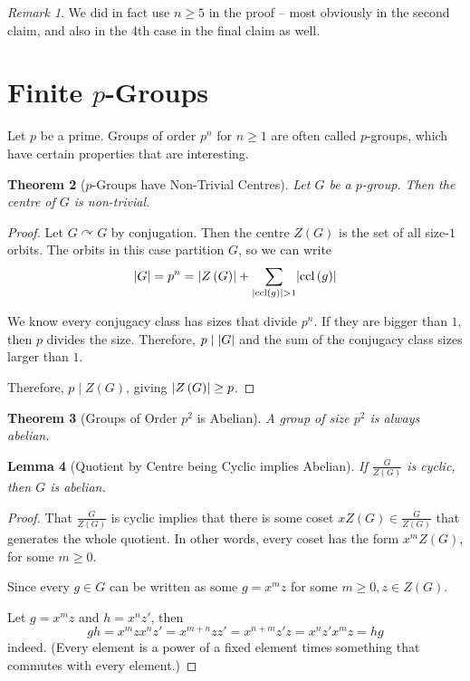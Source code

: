 \documentclass{article}
\newtheorem{theorem}{Theorem}[section]
\newtheorem{lemma}[theorem]{Lemma}
\theoremstyle{definition}
\theoremstyle{remark}
\newtheorem{remark}[theorem]{Remark}
\DeclarePairedDelimiter{\abs}{\lvert}{\rvert}
\newcommand{\pqty}[1]{\left(#1\right)}
\newcommand{\flatfrac}[2]{\frac{#1}{#2}}
\newcommand{\actson}{\curvearrowright}
\newcommand{\divides}{\mid}
\newcommand{\ccl}{\operatorname{ccl}}
\begin{document}
\begin{remark}
    We did in fact use \(n \geq 5\) in the proof -- most obviously in the second claim, and also in the 4th case in the final claim as well.
\end{remark}

\section{Finite \(p\)-Groups}

Let \(p\) be a prime. Groups of order \(p^n\) for \(n \geq 1\) are often called \(p\)-groups, which have certain properties that are interesting.

\begin{theorem}[\(p\)-Groups have Non-Trivial Centres]
    \label{thm:p-groups-non-trivial-centre}%
    Let \(G\) be a \(p\)-group. Then the centre of \(G\) is non-trivial.
\end{theorem}

\begin{proof}
    Let \(G \actson G\) by conjugation. Then the centre \(Z\pqty{G}\) is the set of all size-\(1\) orbits. The orbits in this case partition \(G\), so we can write
    \[
        \abs{G} = p^n = \abs{Z\pqty{G}} + \sum_{\abs{\ccl\pqty{g}} > 1} \abs{\ccl\pqty{g}}
    \]

    We know every conjugacy class has sizes that divide \(p^n\). If they are bigger than \(1\), then \(p\) divides the size. Therefore, \(p \divides \abs{G}\) and the sum of the conjugacy class sizes larger than \(1\).

    Therefore, \(p \divides Z\pqty{G}\), giving \(\abs{Z\pqty{G}} \geq p\).
\end{proof}

\begin{theorem}[Groups of Order \(p^2\) is Abelian]
    \label{thm:order-p2-abelian}%
    A group of size \(p^2\) is always abelian.
\end{theorem}

\begin{lemma}[Quotient by Centre being Cyclic implies Abelian]
    \label{lem:quotient-by-centre-cyclic-abelian}%
    If \(\flatfrac{G}{Z\pqty{G}}\) is cyclic, then \(G\) is abelian.
\end{lemma}

\begin{proof}
    That \(\flatfrac{G}{Z\pqty{G}}\) is cyclic implies that there is some coset \(x Z \pqty{G} \in \flatfrac{G}{Z\pqty{G}}\) that generates the whole quotient. In other words, every coset has the form \(x^m Z\pqty{G}\), for some \(m \geq 0\).

    Since every \(g \in G\) can be written as some \(g = x^m z\) for some \(m \geq 0, z \in Z\pqty{G}\).

    Let \(g = x^m z\) and \(h = x^n z'\), then
    \[
        g h = x^m z x^n z' = x^{m + n} z z' = x^{n + m} z' z = x^n z' x^m z = h g
    \]
    indeed. (Every element is a power of a fixed element times something that commutes with every element.)
\end{proof}
\end{document}
